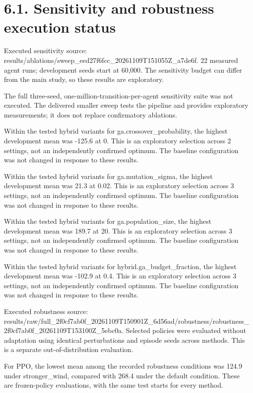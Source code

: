 \documentclass[11pt,a4paper]{article}
\begin{document}
\section*{6.1. Sensitivity and robustness execution status}
Executed sensitivity source: results/ablations/sweep\_eed27f6fcc\_20261109T151055Z\_a7de6f. 22 measured agent runs; development seeds start at 60,000. The sensitivity budget can differ from the main study, so these results are exploratory.

The full three-seed, one-million-transition-per-agent sensitivity suite was not executed. The delivered smaller sweep tests the pipeline and provides exploratory measurements; it does not replace confirmatory ablations.

Within the tested hybrid variants for ga.crossover\_probability, the highest development mean was -125.6 at 0. This is an exploratory selection across 2 settings, not an independently confirmed optimum. The baseline configuration was not changed in response to these results.

Within the tested hybrid variants for ga.mutation\_sigma, the highest development mean was 21.3 at 0.02. This is an exploratory selection across 3 settings, not an independently confirmed optimum. The baseline configuration was not changed in response to these results.

Within the tested hybrid variants for ga.population\_size, the highest development mean was 189.7 at 20. This is an exploratory selection across 3 settings, not an independently confirmed optimum. The baseline configuration was not changed in response to these results.

Within the tested hybrid variants for hybrid.ga\_budget\_fraction, the highest development mean was -102.9 at 0.4. This is an exploratory selection across 3 settings, not an independently confirmed optimum. The baseline configuration was not changed in response to these results.

Executed robustness source: results/raw/full\_2f0cf7ab0f\_20261109T150901Z\_6d56ad/robustness/robustness\_2f0cf7ab0f\_20261109T153100Z\_5ebc0a. Selected policies were evaluated without adaptation using identical perturbations and episode seeds across methods. This is a separate out-of-distribution evaluation.

For PPO, the lowest mean among the recorded robustness conditions was 124.9 under stronger\_wind, compared with 268.4 under the default condition. These are frozen-policy evaluations, with the same test starts for every method.
\end{document}
